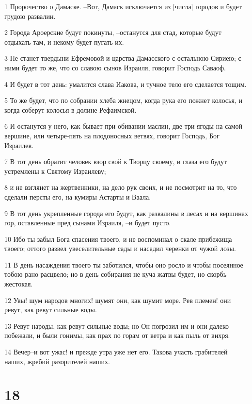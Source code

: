 \par 1 Пророчество о Дамаске. --Вот, Дамаск исключается из [числа] городов и будет грудою развалин.
\par 2 Города Ароерские будут покинуты, --останутся для стад, которые будут отдыхать там, и некому будет пугать их.
\par 3 Не станет твердыни Ефремовой и царства Дамасского с остальною Сириею; с ними будет то же, что со славою сынов Израиля, говорит Господь Саваоф.
\par 4 И будет в тот день: умалится слава Иакова, и тучное тело его сделается тощим.
\par 5 То же будет, что по собрании хлеба жнецом, когда рука его пожнет колосья, и когда соберут колосья в долине Рефаимской.
\par 6 И останутся у него, как бывает при обивании маслин, две-три ягоды на самой вершине, или четыре-пять на плодоносных ветвях, говорит Господь, Бог Израилев.
\par 7 В тот день обратит человек взор свой к Творцу своему, и глаза его будут устремлены к Святому Израилеву;
\par 8 и не взглянет на жертвенники, на дело рук своих, и не посмотрит на то, что сделали персты его, на кумиры Астарты и Ваала.
\par 9 В тот день укрепленные города его будут, как развалины в лесах и на вершинах гор, оставленные пред сынами Израиля, --и будет пусто.
\par 10 Ибо ты забыл Бога спасения твоего, и не воспоминал о скале прибежища твоего; оттого развел увеселительные сады и насадил черенки от чужой лозы.
\par 11 В день насаждения твоего ты заботился, чтобы оно росло и чтобы посеянное тобою рано расцвело; но в день собирания не куча жатвы будет, но скорбь жестокая.
\par 12 Увы! шум народов многих! шумят они, как шумит море. Рев племен! они ревут, как ревут сильные воды.
\par 13 Ревут народы, как ревут сильные воды; но Он погрозил им и они далеко побежали, и были гонимы, как прах по горам от ветра и как пыль от вихря.
\par 14 Вечер--и вот ужас! и прежде утра уже нет его. Такова участь грабителей наших, жребий разорителей наших.

\chapter{18}

